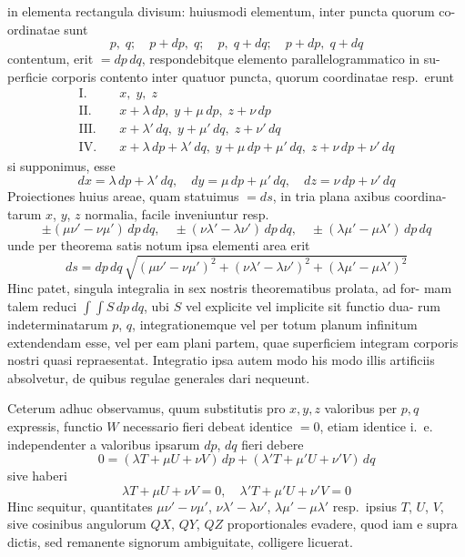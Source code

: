 \documentclass[12pt,a4paper]{article}
\theoremstyle{gauss}
\begin{document}
in elementa rectangula divisum: huiusmodi elementum, inter puncta quorum co-
ordinatae sunt
\[
p,\; q;\quad p+dp,\; q;\quad p,\; q+dq;\quad p+dp,\; q+dq
\]
contentum, erit $=dp\,dq$, respondebitque elemento parallelogrammatico in su-
perficie corporis contento inter quatuor puncta, quorum coordinatae resp.~erunt
\begin{align*}
\text{I.}\quad &x,\; y,\; z \\
\text{II.}\quad &x+\lambda\,dp,\; y+\mu\,dp,\; z+\nu\,dp \\
\text{III.}\quad &x+\lambda'\,dq,\; y+\mu'\,dq,\; z+\nu'\,dq \\
\text{IV.}\quad &x+\lambda\,dp+\lambda'\,dq,\; y+\mu\,dp+\mu'\,dq,\; z+\nu\,dp+\nu'\,dq
\end{align*}
si supponimus, esse
\[
dx = \lambda\,dp + \lambda'\,dq,\quad
dy = \mu\,dp + \mu'\,dq,\quad
dz = \nu\,dp + \nu'\,dq
\]
Proiectiones huius areae, quam statuimus $=ds$, in tria plana axibus coordina-
tarum $x$, $y$, $z$ normalia, facile inveniuntur resp.
\[
\pm(\mu\nu' - \nu\mu')\,dp\,dq,\quad
\pm(\nu\lambda' - \lambda\nu')\,dp\,dq,\quad
\pm(\lambda\mu' - \mu\lambda')\,dp\,dq
\]
unde per theorema satis notum ipsa elementi area erit
\[
ds = dp\,dq\,\sqrt{(\mu\nu'-\nu\mu')^2 + (\nu\lambda'-\lambda\nu')^2 + (\lambda\mu'-\mu\lambda')^2}
\]
Hinc patet, singula integralia in sex nostris theorematibus prolata, ad for-
mam talem reduci $\int\!\!\int S\,dp\,dq$, ubi $S$ vel explicite vel implicite sit functio dua-
rum indeterminatarum $p$, $q$, integrationemque vel per totum planum infinitum
extendendam esse, vel per eam plani partem, quae superficiem integram corporis
nostri quasi repraesentat. Integratio ipsa autem modo his modo illis artificiis
absolvetur, de quibus regulae generales dari nequeunt.

\newpage
\setcounter{page}{23}

Ceterum adhuc observamus, quum substitutis pro $x,y,z$ valoribus per $p,q$
expressis, functio $W$ necessario fieri debeat identice $=0$, etiam identice i.~e.
independenter a valoribus ipsarum $dp$, $dq$ fieri debere
\[
0 = (\lambda T + \mu U + \nu V)\,dp + (\lambda' T + \mu' U + \nu' V)\,dq
\]
sive haberi
\[
\lambda T + \mu U + \nu V = 0,\quad \lambda' T + \mu' U + \nu' V = 0
\]
Hinc sequitur, quantitates $\mu\nu'-\nu\mu'$, $\nu\lambda'-\lambda\nu'$, $\lambda\mu'-\mu\lambda'$ resp.~ipsius $T$, $U$, $V$,
sive cosinibus angulorum $QX$, $QY$, $QZ$ proportionales evadere, quod iam e
supra dictis, sed remanente signorum ambiguitate, colligere licuerat.
\end{document}
